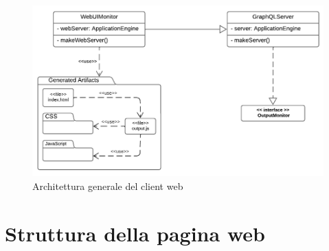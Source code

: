 \begin{figure}[htb]
	\centering
	\includegraphics[scale=0.7]{imgs/Web_Client_Structure.pdf}
	\caption{Architettura generale del client web}
	\label{fig:client-web-structure-graphics}
\end{figure}

\section{Struttura della pagina web}




